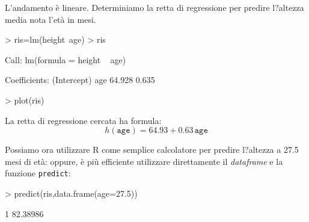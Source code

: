 \documentclass[onecolumn,12pt]{book}
\begin{document}
L'andamento \`e lineare. Determiniamo la retta di regressione
per predire l?altezza media nota l'et\`a in mesi.
\begin{Schunk}
\begin{Sinput}
> ris=lm(height~age)
> ris
\end{Sinput}
\begin{Soutput}
Call:
lm(formula = height ~ age)

Coefficients:
(Intercept)          age  
     64.928        0.635  
\end{Soutput}
\begin{Sinput}
> plot(ris)
\end{Sinput}
\end{Schunk}

La retta di regressione cercata ha formula:
$$h(\texttt{age})=64.93+ 0.63\, \texttt{age}$$

Possiamo ora utilizzare \textsf{R} come semplice calcolatore per predire l?altezza a 27.5 mesi di et\`a:
oppure, \`e pi\`u  efficiente utilizzare direttamente il \emph{dataframe} e la funzione
\texttt{predict}:
\begin{Schunk}
\begin{Sinput}
> predict(ris,data.frame(age=27.5))
\end{Sinput}
\begin{Soutput}
       1 
82.38986 
\end{Soutput}
\end{Schunk}
\end{document}
